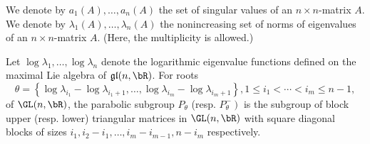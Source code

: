 
We denote by $a_1(A), \dots, a_n(A)$ the  set of singular values of 
an $n\times n$-matrix $A$.
We denote by $\lambda_1(A), \dots, \lambda_n(A)$ the nonincreasing set of norms of 
eigenvalues of an $n\times n$-matrix $A$. (Here, the multiplicity is allowed.) 

Let $\log \lambda_1, \dots, \log \lambda_n$ denote the logarithmic eigenvalue functions defined on
the maximal  Lie algebra of $\mathfrak{gl}(n, \bR)$. 
For roots 
\[\theta=\left\{\log \lambda_{i_{1}}-\log \lambda_{i_{1}+1}, \dots, \log \lambda_{i_{m}}- \log \lambda_{i_{m}+1}\right\}, 
1 \leq i_{1}<\cdots<i_{m} \leq n-1,\] 
of $\GL(n, \bR)$, 
the parabolic
subgroup $P_{\theta}$ (resp. $\left.P_{\theta}^{-}\right)$ is 
the subgroup of block upper 
(resp. lower) triangular matrices in $\GL(n,\bR)$ with square diagonal blocks 
of sizes $i_{1}, i_{2}-i_{1}, \dots, i_{m}-i_{m-1}, n-i_{m}$ respectively. 



